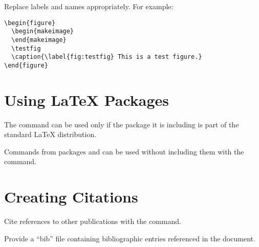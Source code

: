 \documentclass[11pt]{article}
\begin{document}
Replace labels and names appropriately. For example:

\begin{verbatim}
\begin{figure}
  \begin{makeimage}
  \end{makeimage}
  \testfig
  \caption{\label{fig:testfig} This is a test figure.}
\end{figure}
\end{verbatim}


\section{Using \LaTeX{} Packages}

 The  command can be used only if the package it is
including is part of the standard \LaTeX{} distribution.  

Commands from packages  and
 can be used without including them with the
 command.

\section{Creating Citations}

Cite references to other publications with the  command.

Provide a ``bib'' file containing bibliographic entries
referenced in the document.


\begin{htmlonly}

\end{htmlonly}
\end{document}
